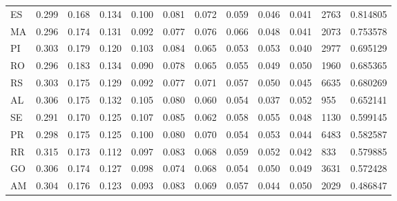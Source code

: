 \begin{tabular}{lrrrrrrrrrlr}
   ES &  0.299 &  0.168 &  0.134 &  0.100 &  0.081 &  0.072 &  0.059 &  0.046 &  0.041 &   2763 &  0.814805 \\
   MA &  0.296 &  0.174 &  0.131 &  0.092 &  0.077 &  0.076 &  0.066 &  0.048 &  0.041 &   2073 &  0.753578 \\
   PI &  0.303 &  0.179 &  0.120 &  0.103 &  0.084 &  0.065 &  0.053 &  0.053 &  0.040 &   2977 &  0.695129 \\
   RO &  0.296 &  0.183 &  0.134 &  0.090 &  0.078 &  0.065 &  0.055 &  0.049 &  0.050 &   1960 &  0.685365 \\
   RS &  0.303 &  0.175 &  0.129 &  0.092 &  0.077 &  0.071 &  0.057 &  0.050 &  0.045 &   6635 &  0.680269 \\
   AL &  0.306 &  0.175 &  0.132 &  0.105 &  0.080 &  0.060 &  0.054 &  0.037 &  0.052 &    955 &  0.652141 \\
   SE &  0.291 &  0.170 &  0.125 &  0.107 &  0.085 &  0.062 &  0.058 &  0.055 &  0.048 &   1130 &  0.599145 \\
   PR &  0.298 &  0.175 &  0.125 &  0.100 &  0.080 &  0.070 &  0.054 &  0.053 &  0.044 &   6483 &  0.582587 \\
   RR &  0.315 &  0.173 &  0.112 &  0.097 &  0.083 &  0.068 &  0.059 &  0.052 &  0.042 &    833 &  0.579885 \\
   GO &  0.306 &  0.174 &  0.127 &  0.098 &  0.074 &  0.068 &  0.054 &  0.050 &  0.049 &   3631 &  0.572428 \\
   AM &  0.304 &  0.176 &  0.123 &  0.093 &  0.083 &  0.069 &  0.057 &  0.044 &  0.050 &   2029 &  0.486847 \\
\bottomrule
\end{tabular}
